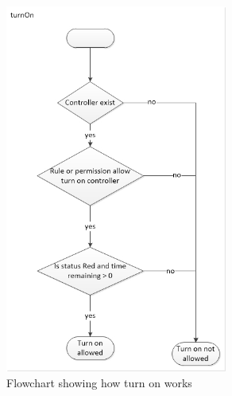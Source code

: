 \begin{figure}[!h]
	\centering
		\includegraphics[width=0.65\textwidth]{images/turnOnAPI1.jpg}
	\caption{Flowchart showing how turn on works}
	\label{fig:turnOnAPI1}
\end{figure}
 
